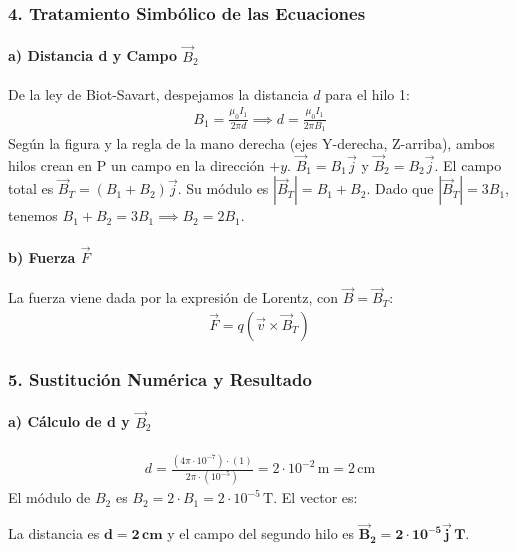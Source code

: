 \subsubsection*{4. Tratamiento Simbólico de las Ecuaciones}
\paragraph*{a) Distancia d y Campo $\vec{B}_2$}
De la ley de Biot-Savart, despejamos la distancia $d$ para el hilo 1:
\begin{gather}
    B_1 = \frac{\mu_0 I_1}{2\pi d} \implies d = \frac{\mu_0 I_1}{2\pi B_1}
\end{gather}
Según la figura y la regla de la mano derecha (ejes Y-derecha, Z-arriba), ambos hilos crean en P un campo en la dirección $+y$.
$\vec{B}_1 = B_1 \vec{j}$ y $\vec{B}_2 = B_2 \vec{j}$.
El campo total es $\vec{B}_T = (B_1+B_2)\vec{j}$. Su módulo es $|\vec{B}_T| = B_1+B_2$.
Dado que $|\vec{B}_T| = 3B_1$, tenemos $B_1+B_2 = 3B_1 \implies B_2 = 2B_1$.
\paragraph*{b) Fuerza $\vec{F}$}
La fuerza viene dada por la expresión de Lorentz, con $\vec{B} = \vec{B}_T$:
\begin{gather}
    \vec{F} = q(\vec{v} \times \vec{B}_T)
\end{gather}

\subsubsection*{5. Sustitución Numérica y Resultado}
\paragraph*{a) Cálculo de d y $\vec{B}_2$}
\begin{gather}
    d = \frac{(4\pi\cdot10^{-7}) \cdot (1)}{2\pi \cdot (10^{-5})} = 2\cdot10^{-2}\,\text{m} = 2\,\text{cm}
\end{gather}
El módulo de $B_2$ es $B_2 = 2 \cdot B_1 = 2 \cdot 10^{-5}\,\text{T}$. El vector es:
\begin{cajaresultado}
    La distancia es $\boldsymbol{d = 2\,\textbf{cm}}$ y el campo del segundo hilo es $\boldsymbol{\vec{B}_2 = 2\cdot10^{-5}\vec{j}\,\textbf{T}}$.
\end{cajaresultado}
